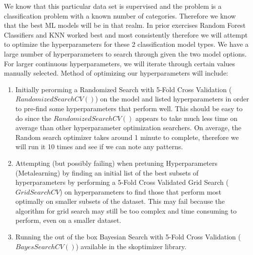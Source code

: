 \documentclass[titlepage]{article}
\begin{document}
		\vspace{.2cm}
		We know that this particular data set is supervised and the problem is a classification problem with a known number of categories. Therefore we know that the best ML models will be in that realm.  In prior exercises Random Forest Classifiers and KNN worked best and most consistently therefore we will attempt to optimize the hyperparameters for these 2 classification model types.  We have a large number of hyperparameters to search through given the two model options. For larger continuous hyperparameters, we will iterate through certain values manually selected.  Method of optimizing our hyperparameters will include:  
	\begin{enumerate}
		\item Initially perorming a Randomized Search with 5-Fold Cross Validation ($RandomizedSearchCV()$) on the model and listed hyperparameters in order to pre-find some hyperparameters that perform well.  This should be easy to do since the $RandomizedSearchCV()$ appears to take much less time on average than other hyperparameter optimization searchers.  On average, the Random search optimizer takes around 1 minute to complete, therefore we will run it 10 times and see if we can note any patterns.  
		\item Attempting (but possibly failing) when pretuning Hyperparameters (Metalearning) by finding an initial list of the best subsets of hyperparameters by performing a 5-Fold Cross Validated Grid Search ($GridSearchCV$) on hyperparameters to find those that perform most optimally on smaller subsets of the dataset.  This may fail because the algorithm for grid search may still be too complex and time consuming to perform, even on a smaller dataset. 
		\item Running the out of the box Bayesian Search with 5-Fold Cross Validation ($BayesSearchCV()$) available in the skoptimizer library.  
	\end{enumerate}
	
\end{document}
